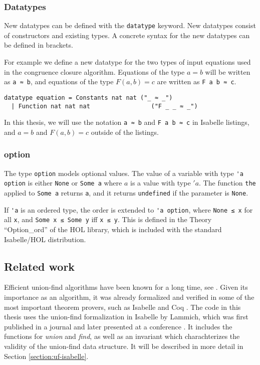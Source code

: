 \subsubsection{Datatypes}
\label{subsubsection:datatypes}

New datatypes can be defined with the \lstinline|datatype| keyword. New datatypes consist of constructors and existing types. A concrete syntax for the new datatypes can be defined in brackets.

For example we define a new datatype for the two types of input equations used in the congruence closure algorithm. Equations of the type $a = b$ will be written as \lstinline{a ≈ b}, and equations of the type $F(a, b) = c$ are written as \lstinline{F a b ≈ c}.

\begin{lstlisting}
datatype equation = Constants nat nat ("_ ≈ _")
  | Function nat nat nat                 ("F _ _ ≈ _")
\end{lstlisting}

In this thesis, we will use the notation \lstinline{a ≈ b} and \lstinline{F a b ≈ c} in Isabelle listings, and $a = b$ and $F(a, b) = c$ outside of the listings.

\subsubsection{option}

The type \lstinline{option} models optional values. The value of a variable with type \lstinline{'a option} is either \lstinline|None| or \lstinline|Some a| where $a$ is a value with type $'a$. The function \lstinline|the| applied to \lstinline|Some a| returns \lstinline|a|, and it returns \lstinline|undefined| if the parameter is \lstinline|None|.

If \lstinline{'a} is an ordered type, the order is extended to \lstinline{'a option}, where \lstinline{None ≤ x} for all \lstinline|x|, and \lstinline{Some x ≤ Some y} iff \lstinline{x ≤ y}. This is defined in the Theory ``Option\_ord'' of the HOL library, which is included with the standard Isabelle/HOL distribution.

\subsection{Related work}

Efficient union-find algorithms have been known for a long time, see \cite{unionfind-og, Tarjan}. Given its importance as an algorithm, it was already formalized and verified in some of the most important theorem provers, such as Isabelle and Coq \cite{unionfind-persistent}. The code in this thesis uses the union-find formalization in Isabelle by Lammich, which was first published in a journal \cite{unionfind-isabelle} and later presented at a conference \cite{unionfind-isabelle-conference}. It includes the functions for \emph{union} and \emph{find}, as well as an invariant which charachterizes the validity of the union-find data structure. It will be described in more detail in Section \ref{section:uf-isabelle}.

